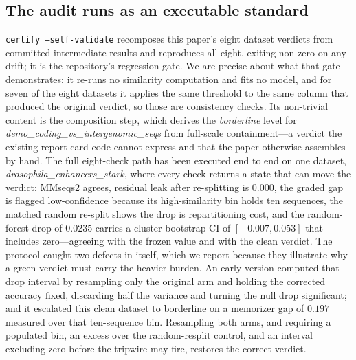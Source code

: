 \subsection{The audit runs as an executable standard}\label{sec:r-certify}
\texttt{certify --self-validate} recomposes this paper's eight dataset verdicts from committed intermediate results and reproduces all eight, exiting non-zero on any drift; it is the repository's regression gate. We are precise about what that gate demonstrates: it re-runs no similarity computation and fits no model, and for seven of the eight datasets it applies the same threshold to the same column that produced the original verdict, so those are consistency checks. Its non-trivial content is the composition step, which derives the \emph{borderline} level for \textit{demo\_coding\_vs\_intergenomic\_seqs} from full-scale containment---a verdict the existing report-card code cannot express and that the paper otherwise assembles by hand. The full eight-check path has been executed end to end on one dataset, \textit{drosophila\_enhancers\_stark}, where every check returns a state that can move the verdict: MMseqs2 agrees, residual leak after re-splitting is $0.000$, the graded gap is flagged low-confidence because its high-similarity bin holds ten sequences, the matched random re-split shows the drop is repartitioning cost, and the random-forest drop of $0.0235$ carries a cluster-bootstrap CI of $[-0.007,0.053]$ that includes zero---agreeing with the frozen value and with the clean verdict. The protocol caught two defects in itself, which we report because they illustrate why a green verdict must carry the heavier burden. An early version computed that drop interval by resampling only the original arm and holding the corrected accuracy fixed, discarding half the variance and turning the null drop significant; and it escalated this clean dataset to borderline on a memorizer gap of $0.197$ measured over that ten-sequence bin. Resampling both arms, and requiring a populated bin, an excess over the random-resplit control, and an interval excluding zero before the tripwire may fire, restores the correct verdict.
